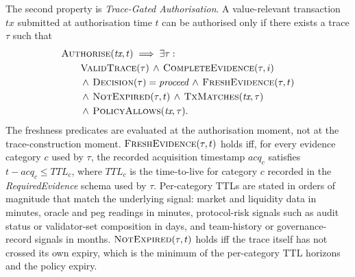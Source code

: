 The second property is \emph{Trace-Gated Authorisation}. A value-relevant transaction $\textit{tx}$ submitted at authorisation time $t$ can be authorised only if there exists a trace $\tau$ such that
\begin{equation}
\begin{aligned}
&\textsc{Authorise}(\textit{tx}, t)
  \;\Longrightarrow\; \exists \tau: \\
&\qquad \textsc{ValidTrace}(\tau)
  \,\wedge\, \textsc{CompleteEvidence}(\tau, i) \\
&\qquad \wedge\, \textsc{Decision}(\tau) = \textit{proceed}
  \,\wedge\, \textsc{FreshEvidence}(\tau, t) \\
&\qquad \wedge\, \textsc{NotExpired}(\tau, t)
  \,\wedge\, \textsc{TxMatches}(\textit{tx}, \tau) \\
&\qquad \wedge\, \textsc{PolicyAllows}(\textit{tx}, \tau).
\end{aligned}
\end{equation}
The freshness predicates are evaluated at the authorisation moment, not at the trace-construction moment. $\textsc{FreshEvidence}(\tau, t)$ holds iff, for every evidence category $c$ used by $\tau$, the recorded acquisition timestamp $\textit{acq}_c$ satisfies $t - \textit{acq}_c \leq \textit{TTL}_c$, where $\textit{TTL}_c$ is the time-to-live for category $c$ recorded in the \textit{RequiredEvidence} schema used by $\tau$. Per-category TTLs are stated in orders of magnitude that match the underlying signal: market and liquidity data in minutes, oracle and peg readings in minutes, protocol-risk signals such as audit status or validator-set composition in days, and team-history or governance-record signals in months. $\textsc{NotExpired}(\tau, t)$ holds iff the trace itself has not crossed its own expiry, which is the minimum of the per-category TTL horizons and the policy expiry.

